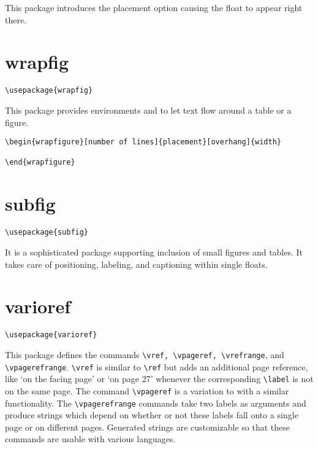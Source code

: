 This package introduces the placement option  causing the float to appear right there.



\section{wrapfig}
\label{sec:wrapfig}
\begin{lstlisting}
\usepackage{wrapfig}
\end{lstlisting}

This package provides environments  and  to let text flow around a table or a figure.



\begin{lstlisting}
\begin{wrapfigure}[number of lines]{placement}[overhang]{width}
  
\end{wrapfigure}
\end{lstlisting}



\section{subfig}
\label{sec:subfig}
\begin{lstlisting}
\usepackage{subfig}
\end{lstlisting}

It is a sophisticated package supporting inclusion of small figures and tables.
It takes care of positioning, labeling, and captioning within single floats.



\section{varioref}
\label{sec:varioref}
\begin{lstlisting}
\usepackage{varioref}
\end{lstlisting}


This package defines the commands \lstinline|\vref, \vpageref, \vrefrange|, and \lstinline|\vpagerefrange|.
\lstinline|\vref| is similar to \lstinline|\ref| but adds an additional page reference, like ‘on the facing page’ or ‘on page 27’ whenever the corresponding \lstinline|\label| is not on the same page.
The command \lstinline|\vpageref| is a variation to \pageref with a similar functionality.
The \lstinline|\vpagerefrange| commands take two labels as arguments and produce strings which depend on whether or not these labels fall onto a single page or on different pages. Generated strings are customizable so that these commands are usable with various languages.



